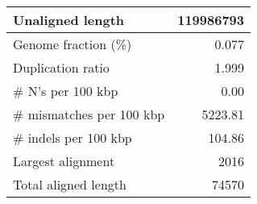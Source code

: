 \documentclass[12pt,a4paper]{article}
\begin{document}
\begin{table}[ht]
\begin{center}
\begin{tabular}{|l*{1}{|r}|}
Unaligned length & 119986793 \\ \hline
Genome fraction (\%) & 0.077 \\ \hline
Duplication ratio & 1.999 \\ \hline
\# N's per 100 kbp & 0.00 \\ \hline
\# mismatches per 100 kbp & 5223.81 \\ \hline
\# indels per 100 kbp & 104.86 \\ \hline
Largest alignment & 2016 \\ \hline
Total aligned length & 74570 \\ \hline
\end{tabular}
\end{center}
\end{table}
\end{document}

